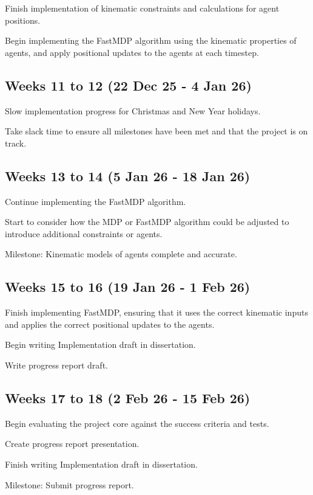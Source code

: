 \documentclass[12pt,a4paper,twoside]{article}
\begin{document}
Finish implementation of kinematic constraints and calculations for agent positions.

Begin implementing the FastMDP algorithm using the kinematic properties of agents, and apply positional updates to the agents at each timestep.

\subsection*{Weeks 11 to 12 (22 Dec 25 - 4 Jan 26)}

Slow implementation progress for Christmas and New Year holidays.

Take slack time to ensure all milestones have been met and that the project is on track.

\subsection*{Weeks 13 to 14 (5 Jan 26 - 18 Jan 26)}

Continue implementing the FastMDP algorithm.

Start to consider how the MDP or FastMDP algorithm could be adjusted to introduce additional constraints or agents.

Milestone: Kinematic models of agents complete and accurate.

\subsection*{Weeks 15 to 16 (19 Jan 26 - 1 Feb 26)}

Finish implementing FastMDP, ensuring that it uses the correct kinematic inputs and applies the correct positional updates to the agents.

Begin writing Implementation draft in dissertation.

Write progress report draft.

\subsection*{Weeks 17 to 18 (2 Feb 26 - 15 Feb 26)}

Begin evaluating the project core against the success criteria and tests.

Create progress report presentation.

Finish writing Implementation draft in dissertation.

Milestone: Submit progress report.
\end{document}
